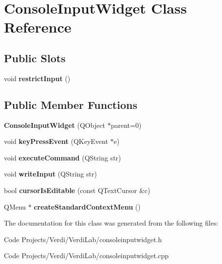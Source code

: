 \hypertarget{class_console_input_widget}{\section{\-Console\-Input\-Widget \-Class \-Reference}
\label{class_console_input_widget}
}
\subsection*{\-Public \-Slots}
\begin{DoxyCompactItemize}
\item 
\hypertarget{class_console_input_widget_ac2e91f6ed333da1eed3a23c4930b5db0}{void {\bfseries restrict\-Input} ()}\label{class_console_input_widget_ac2e91f6ed333da1eed3a23c4930b5db0}

\end{DoxyCompactItemize}
\subsection*{\-Public \-Member \-Functions}
\begin{DoxyCompactItemize}
\item 
\hypertarget{class_console_input_widget_a74d5b8dd51484f23ecae23ba98242abc}{{\bfseries \-Console\-Input\-Widget} (\-Q\-Object $\ast$parent=0)}\label{class_console_input_widget_a74d5b8dd51484f23ecae23ba98242abc}

\item 
\hypertarget{class_console_input_widget_ae6c32d3844d0216e8ebc944402ee4865}{void {\bfseries key\-Press\-Event} (\-Q\-Key\-Event $\ast$e)}\label{class_console_input_widget_ae6c32d3844d0216e8ebc944402ee4865}

\item 
\hypertarget{class_console_input_widget_ac8317b65c969177272e746db42a8b9d9}{void {\bfseries execute\-Command} (\-Q\-String str)}\label{class_console_input_widget_ac8317b65c969177272e746db42a8b9d9}

\item 
\hypertarget{class_console_input_widget_a19fe3ea72bf65e812e9e2098ea6cc6b5}{void {\bfseries write\-Input} (\-Q\-String str)}\label{class_console_input_widget_a19fe3ea72bf65e812e9e2098ea6cc6b5}

\item 
\hypertarget{class_console_input_widget_adbf4297ed02e27e9ab9d43005d4b1faf}{bool {\bfseries cursor\-Is\-Editable} (const \-Q\-Text\-Cursor \&c)}\label{class_console_input_widget_adbf4297ed02e27e9ab9d43005d4b1faf}

\item 
\hypertarget{class_console_input_widget_adbbb784516667485deb654a77cee1147}{\-Q\-Menu $\ast$ {\bfseries create\-Standard\-Context\-Menu} ()}\label{class_console_input_widget_adbbb784516667485deb654a77cee1147}

\end{DoxyCompactItemize}


\-The documentation for this class was generated from the following files\-:\begin{DoxyCompactItemize}
\item 
\-Code Projects/\-Verdi/\-Verdi\-Lab/consoleinputwidget.\-h\item 
\-Code Projects/\-Verdi/\-Verdi\-Lab/consoleinputwidget.\-cpp\end{DoxyCompactItemize}

